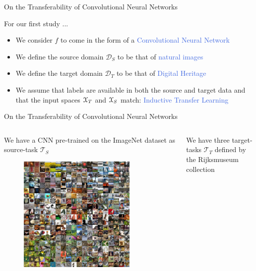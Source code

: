 \documentclass{beamer}
\begin{document}
\begin{frame}{On the Transferability of Convolutional Neural Networks}

	For our first study ...
	\bigskip
	\begin{itemize}
		\item We consider $f$ to come in the form of a \textcolor{RoyalBlue}{Convolutional Neural Network}
		\item We define the source domain $\mathcal{D}_S$ to be that of \textcolor{RoyalBlue}{natural images}
		\item We define the target domain $\mathcal{D}_T$ to be that of \textcolor{RoyalBlue}{Digital Heritage}
		\item We assume that labels are available in both the source and target data and that the input spaces ${\cal X}_T$ and ${\cal X}_S$ match: \textcolor{RoyalBlue}{Inductive Transfer Learning}
	\end{itemize}

\end{frame}


\begin{frame}{On the Transferability of Convolutional Neural Networks}

	\begin{columns}
		\begin{column}{.5\textwidth}
			We have a CNN pre-trained on the ImageNet dataset as source-task $\mathcal{T}_S$ 

			\begin{figure}
				\includegraphics[width=0.8\textwidth]{figures/imagenet}
			\end{figure}

		\end{column}
		
		\begin{column}{.5\textwidth}
			We have three target-tasks $\mathcal{T}_T$ defined by the Rijksmuseum collection

		\end{column}
		
	\end{columns}

\end{frame}
\end{document}

